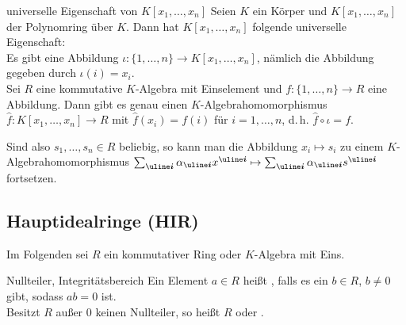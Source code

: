 \begin{Satz}{universelle Eigenschaft von $K[x_1, \dotsc, x_n]$}
    Seien $K$ ein Körper und
    $K[x_1, \dotsc, x_n]$ der Polynomring über $K$.
    Dann hat $K[x_1, \dotsc, x_n]$ folgende universelle Eigenschaft: \\
    Es gibt eine Abbildung
    $\iota: \{1, \dotsc, n\} \rightarrow K[x_1, \dotsc, x_n]$,
    nämlich die Abbildung gegeben durch $\iota(i) = x_i$. \\
    Sei $R$ eine kommutative $K$-Algebra mit Einselement und
    $f: \{1, \dotsc, n\} \rightarrow R$ eine Abbildung.
    Dann gibt es genau einen $K$-Algebrahomomorphismus
    $\widehat{f}: K[x_1, \dotsc, x_n] \rightarrow R$ mit
    $\widehat{f}(x_i) = f(i)$ für $i = 1, \dotsc, n$,
    d.\,h. $\widehat{f} \circ \iota = f$.
\end{Satz}

\begin{Bem}
    Sind also $s_1, \dotsc, s_n \in R$ beliebig, so kann man
    die Abbildung $x_i \mapsto s_i$ zu einem $K$-Algebrahomomorphismus
    $\sum_{\mi{i}} \alpha_{\mi{i}} x^{\mi{i}} \mapsto
    \sum_{\mi{i}} \alpha_{\mi{i}} s^{\mi{i}}$ fortsetzen.
\end{Bem}

\subsection{%
    Hauptidealringe (HIR)%
}

\begin{Bem}
    Im Folgenden sei $R$ ein kommutativer Ring oder $K$-Algebra mit Eins.
\end{Bem}

\begin{Def}{Nullteiler, Integritätsbereich}
    Ein Element $a \in R$ heißt , falls
    es ein $b \in R$, $b \not= 0$ gibt, sodass $ab = 0$ ist. \\
    Besitzt $R$ außer $0$ keinen Nullteiler, so heißt
    $R$  oder .
\end{Def}

